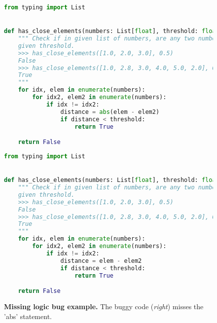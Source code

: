 \begin{figure}[htbp]
\centering
\begin{minipage}{0.45\textwidth}
\begin{lstlisting}[language=Python,breaklines=true,basicstyle=\ttfamily\scriptsize]
from typing import List


def has_close_elements(numbers: List[float], threshold: float) -> bool:
    """ Check if in given list of numbers, are any two numbers closer to each other than
    given threshold.
    >>> has_close_elements([1.0, 2.0, 3.0], 0.5)
    False
    >>> has_close_elements([1.0, 2.8, 3.0, 4.0, 5.0, 2.0], 0.3)
    True
    """
    for idx, elem in enumerate(numbers):
        for idx2, elem2 in enumerate(numbers):
            if idx != idx2:
                distance = abs(elem - elem2)
                if distance < threshold:
                    return True

    return False
\end{lstlisting}
\end{minipage}\hfill
\begin{minipage}{0.45\textwidth}
\begin{lstlisting}[language=Python,breaklines=true,basicstyle=\ttfamily\scriptsize]
from typing import List


def has_close_elements(numbers: List[float], threshold: float) -> bool:
    """ Check if in given list of numbers, are any two numbers closer to each other than
    given threshold.
    >>> has_close_elements([1.0, 2.0, 3.0], 0.5)
    False
    >>> has_close_elements([1.0, 2.8, 3.0, 4.0, 5.0, 2.0], 0.3)
    True
    """
    for idx, elem in enumerate(numbers):
        for idx2, elem2 in enumerate(numbers):
            if idx != idx2:
                distance = elem - elem2
                if distance < threshold:
                    return True

    return False
\end{lstlisting}
\end{minipage}
\caption{\textbf{Missing logic bug example.} The buggy code (\emph{right}) misses the 'abs' statement.}
\label{fig:missinglogic}
\end{figure}

